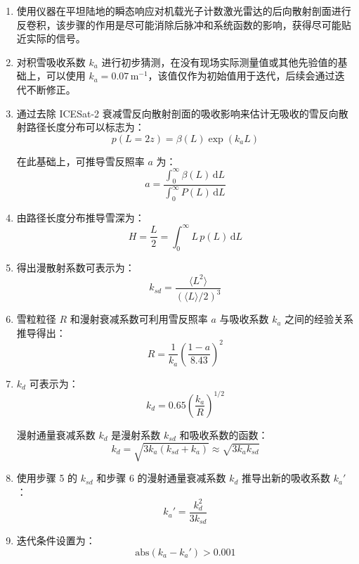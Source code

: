 \begin{enumerate}
  \item 使用仪器在平坦陆地的瞬态响应对机载光子计数激光雷达的后向散射剖面进行反卷积，该步骤的作用是尽可能消除后脉冲和系统函数的影响，获得尽可能贴近实际的信号。

  \item 对积雪吸收系数 $k_a$ 进行初步猜测，在没有现场实际测量值或其他先验值的基础上，可以使用 $k_a = 0.07\,\mathrm{m}^{-1}$，该值仅作为初始值用于迭代，后续会通过迭代不断修正。

  \item 通过去除 ICESat-2 衰减雪反向散射剖面的吸收影响来估计无吸收的雪反向散射路径长度分布可以标志为：
  \begin{equation}
  p(L = 2z)
  =
  \beta(L)\exp(k_a L)
  \end{equation}

  在此基础上，可推导雪反照率 $a$ 为：
  \begin{equation}
  a
  =
  \dfrac{\displaystyle \int_{0}^{\infty} \beta(L)\,\mathrm{d}L}
  {\displaystyle \int_{0}^{\infty} P(L)\,\mathrm{d}L}
  \end{equation}

  \item 由路径长度分布推导雪深为：
  \begin{equation}
  H
  =
  \dfrac{L}{2}
  =
  \int_{0}^{\infty} L\, p(L)\,\mathrm{d}L
  \end{equation}

  \item 得出漫散射系数可表示为：
  \begin{equation}
  k_{sd}
  =
  \dfrac{\langle L^{2}\rangle}
  {(\langle L\rangle/2)^{3}}
  \end{equation}

  \item 雪粒粒径 $R$ 和漫射衰减系数可利用雪反照率 $a$ 与吸收系数 $k_a$ 之间的经验关系推导得出：
  \begin{equation}
  R
  =
  \dfrac{1}{k_a}
  \left(
  \dfrac{1-a}{8.43}
  \right)^{2}
  \end{equation}

  \item $k_d$ 可表示为：
  \begin{equation}
  k_d
  =
  0.65\left(\dfrac{k_a}{R}\right)^{1/2}
  \end{equation}

  漫射通量衰减系数 $k_d$ 是漫射系数 $k_{sd}$ 和吸收系数的函数：
  \begin{equation}
  k_d
  =
  \sqrt{3k_a(k_{sd}+k_a)}
  \approx
  \sqrt{3k_a k_{sd}}
  \end{equation}

  \item 使用步骤 5 的 $k_{sd}$ 和步骤 6 的漫射通量衰减系数 $k_d$
  推导出新的吸收系数 $k_a'$：
  \begin{equation}
  k_a'
  =
  \dfrac{k_d^{2}}{3k_{sd}}
  \end{equation}

  \item 迭代条件设置为：
  \begin{equation}
  \mathrm{abs}(k_a - k_a') > 0.001
  \end{equation}
\end{enumerate}

